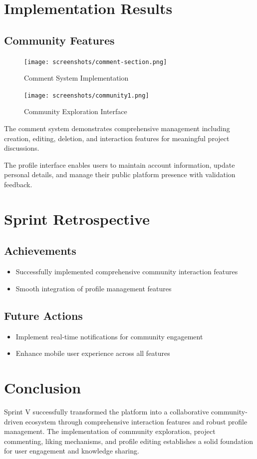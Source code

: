 \section{Implementation Results}

\subsection{Community Features}
\begin{figure}[H]
    \centering
    \texttt{[image: screenshots/comment-section.png]}
    \caption{Comment System Implementation}
    \label{fig:comment_section}
    \end{figure}

\begin{figure}[H]
\centering
\texttt{[image: screenshots/community1.png]}
\caption{Community Exploration Interface}
\label{fig:community_main}
\end{figure}




The comment system demonstrates comprehensive management including creation, editing, deletion, and interaction features for meaningful project discussions.



The profile interface enables users to maintain account information, update personal details, and manage their public platform presence with validation feedback.

\section{Sprint Retrospective}

\subsection{Achievements}
\begin{itemize}
\item Successfully implemented comprehensive community interaction features
\item Smooth integration of profile management features
\end{itemize}


\subsection{Future Actions}
\begin{itemize}
\item Implement real-time notifications for community engagement
\item Enhance mobile user experience across all features
\end{itemize}

\section{Conclusion}

Sprint V successfully transformed the platform into a collaborative community-driven ecosystem through comprehensive interaction features and robust profile management. The implementation of community exploration, project commenting, liking mechanisms, and profile editing establishes a solid foundation for user engagement and knowledge sharing.

